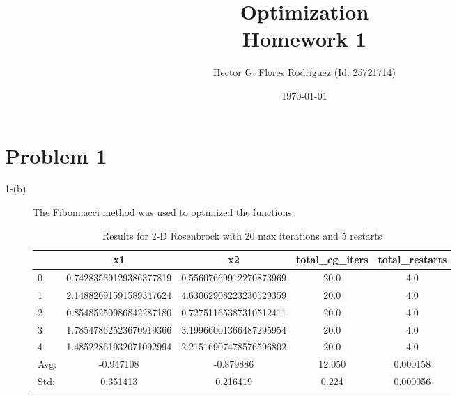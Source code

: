\documentclass[11pt,onside]{article}
\title{\blue Optimization \\
\blueb Homework 1}
\author{Hector G. Flores Rodriguez (Id. 25721714)}
\date{\today} %
\begin{document}
\maketitle

\section{Problem 1}
\begin{description}
\item[1-(b)] The Fibonnacci method was used to optimized the functions:

\begin {table}[ht]
\centering
\caption {Results for 2-D Rosenbrock with 20 max iterations and 5 restarts}
\begin{tabular}{lcccc}
\toprule
{} &                      x1 &                      x2 &  total\_cg\_iters &  total\_restarts \\
\midrule
0 &  0.74283539129386377819 &  0.55607669912270873969 &            20.0 &             4.0 \\
1 &  2.14882691591589347624 &  4.63062908223230529359 &            20.0 &             4.0 \\
2 &  0.85485250986842287180 &  0.72751165387310512411 &            20.0 &             4.0 \\
3 &  1.78547862523670919366 &  3.19966001366487295954 &            20.0 &             4.0 \\
4 &  1.48522861932071092994 &  2.21516907478576596802 &            20.0 &             4.0 \\
\bottomrule
Avg: & -0.947108 & -0.879886 & 12.050 & 0.000158 \\
Std: & 0.351413 & 0.216419 & 0.224 & 0.000056 \\
\bottomrule
\end{tabular}
\end{table}




\end{description}
\end{document}
